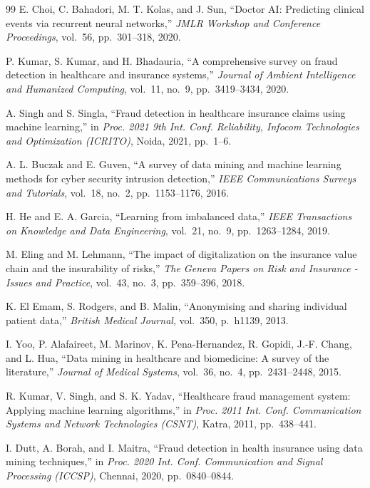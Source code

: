 \begin{thebibliography}{99}
E. Choi, C. Bahadori, M. T. Kolas, and J. Sun,
``Doctor AI: Predicting clinical events via recurrent neural networks,''
\textit{JMLR Workshop and Conference Proceedings},
vol.~56, pp.~301--318, 2020.

P. Kumar, S. Kumar, and H. Bhadauria,
``A comprehensive survey on fraud detection in healthcare and insurance systems,''
\textit{Journal of Ambient Intelligence and Humanized Computing},
vol.~11, no.~9, pp.~3419--3434, 2020.

A. Singh and S. Singla,
``Fraud detection in healthcare insurance claims using machine learning,''
in \textit{Proc. 2021 9th Int. Conf. Reliability, Infocom Technologies and Optimization (ICRITO)},
Noida, 2021, pp.~1--6.

A. L. Buczak and E. Guven,
``A survey of data mining and machine learning methods for cyber security intrusion detection,''
\textit{IEEE Communications Surveys and Tutorials},
vol.~18, no.~2, pp.~1153--1176, 2016.

H. He and E. A. Garcia,
``Learning from imbalanced data,''
\textit{IEEE Transactions on Knowledge and Data Engineering},
vol.~21, no.~9, pp.~1263--1284, 2019.

M. Eling and M. Lehmann,
``The impact of digitalization on the insurance value chain and the insurability of risks,''
\textit{The Geneva Papers on Risk and Insurance - Issues and Practice},
vol.~43, no.~3, pp.~359--396, 2018.

K. El Emam, S. Rodgers, and B. Malin,
``Anonymising and sharing individual patient data,''
\textit{British Medical Journal},
vol.~350, p.~h1139, 2013.

I. Yoo, P. Alafaireet, M. Marinov, K. Pena-Hernandez, R. Gopidi, J.-F. Chang, and L. Hua,
``Data mining in healthcare and biomedicine: A survey of the literature,''
\textit{Journal of Medical Systems},
vol.~36, no.~4, pp.~2431--2448, 2015.

R. Kumar, V. Singh, and S. K. Yadav,
``Healthcare fraud management system: Applying machine learning algorithms,''
in \textit{Proc. 2011 Int. Conf. Communication Systems and Network Technologies (CSNT)},
Katra, 2011, pp.~438--441.

I. Dutt, A. Borah, and I. Maitra,
``Fraud detection in health insurance using data mining techniques,''
in \textit{Proc. 2020 Int. Conf. Communication and Signal Processing (ICCSP)},
Chennai, 2020, pp.~0840--0844.


\end{thebibliography}
